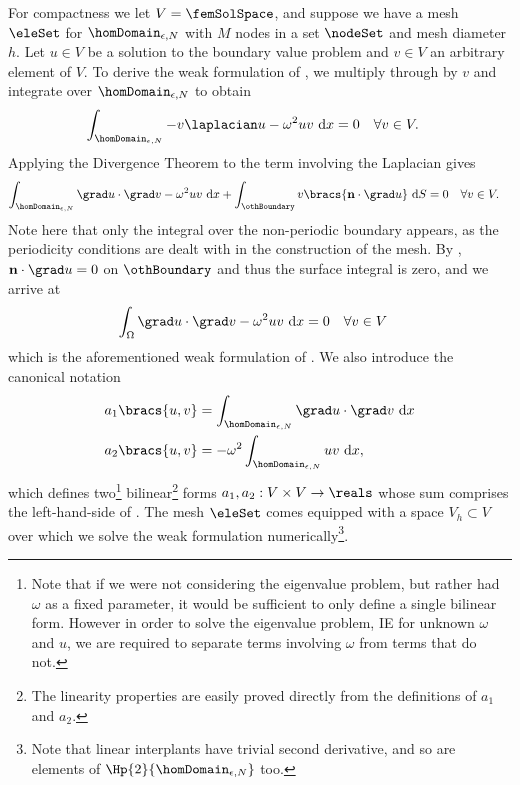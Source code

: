 For compactness we let $V = \femSolSpace$, and suppose we have a mesh $\eleSet$ for $\homDomain_{\epsilon, N}$ with $M$ nodes in a set $\nodeSet$ and mesh diameter $h$.
Let $u\in V$ be a solution to the boundary value problem  and $v\in V$ an arbitrary element of $V$.
To derive the weak formulation of , we multiply through by $v$ and integrate over $\homDomain_{\epsilon, N}$ to obtain
\begin{align*}
	\int_{\homDomain_{\epsilon, N}}-v\laplacian u - \omega^{2}uv \ \mathrm{d}x = 0 &\quad \forall v\in V.
\end{align*}
Applying the Divergence Theorem to the term involving the Laplacian gives
\begin{align*}
	\int_{\homDomain_{\epsilon, N}}\grad u\cdot\grad v - \omega^{2}uv \ \mathrm{d}x + \int_{\othBoundary}v\bracs{\mathbf{n}\cdot\grad u}\ \mathrm{d}S = 0 &\quad \forall v\in V.
\end{align*}
Note here that only the integral over the non-periodic boundary appears, as the periodicity conditions are dealt with in the construction of the mesh.
By , $\mathbf{n}\cdot\grad u=0$ on $\othBoundary$ and thus the surface integral is zero, and we arrive at
\begin{align}
	\int_{\Omega}\grad u\cdot\grad v - \omega^{2}uv \ \mathrm{d}x = 0 &\quad \forall v\in V\label{eq:FEMWeakForm}
\end{align}
which is the aforementioned weak formulation of .
We also introduce the canonical notation
\begin{align*}
	a_{1}\bracs{u,v} &= \int_{\homDomain_{\epsilon, N}}\grad u\cdot\grad v \ \mathrm{d}x \\
	a_{2}\bracs{u,v} &= -\omega^{2}\int_{\homDomain_{\epsilon, N}} uv \ \mathrm{d}x,
\end{align*}
which defines two\footnote{Note that if we were not considering the eigenvalue problem, but rather had $\omega$ as a fixed parameter, it would be sufficient to only define a single bilinear form. However in order to solve the eigenvalue problem, IE for unknown $\omega$ and $u$, we are required to separate terms involving $\omega$ from terms that do not.} bilinear\footnote{The linearity properties are easily proved directly from the definitions of $a_{1}$ and $a_{2}$.} forms $a_{1},a_{2}:V\times V\rightarrow\reals$ whose sum comprises the left-hand-side of .
The mesh $\eleSet$ comes equipped with a space $V_{h}\subset V$ over which we solve the weak formulation numerically\footnote{Note that linear interplants have trivial second derivative, and so are elements of $\Hp{2}{\homDomain_{\epsilon, N}}$ too.}.
